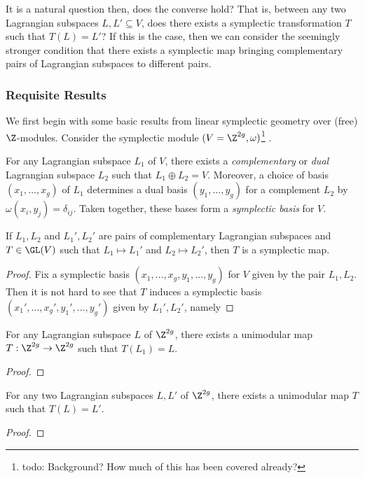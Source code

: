 It is a natural question then, does the converse hold? That is, between any two Lagrangian subspaces $L,L' \subseteq V$, does there exists a symplectic transformation $T$ such that $T(L) = L'$? If this is the case, then we can consider the seemingly stronger condition that there exists a symplectic map bringing complementary pairs of Lagrangian subspaces to different pairs.

\subsubsection*{Requisite Results}
We first begin with some basic results from linear symplectic geometry over (free) $\Z$-modules. Consider the symplectic module $(V = \Z^{2g}, \omega)$\footnote{todo: Background? How much of this has been covered already?} .
\begin{theorem}
	For any Lagrangian subspace $L_1$ of $V$, there exists a \textit{complementary} or \textit{dual} Lagrangian subspace $L_2$ such that $L_1 \oplus L_2 = V$. Moreover, a choice of basis $(x_1,\dots,x_g)$ of $L_1$ determines a dual basis $(y_1,\dots,y_g)$ for a complement $L_2$ by $\omega(x_i, y_j) = \delta_{ij}$. Taken together, these bases form a \textit{symplectic basis} for $V$. 
\end{theorem}

\begin{proposition}
	If $L_1,L_2$ and $L_1',L_2'$ are pairs of complementary Lagrangian subspaces and $T \in \GL(V)$ such that $L_1 \mapsto L_1'$ and $L_2 \mapsto L_2'$, then $T$ is a symplectic map.
\end{proposition}
\begin{proof}
	Fix a symplectic basis $(x_1,\dots,x_g,y_1,\dots,y_g)$ for $V$ given by the pair $L_1,L_2$. Then it is not hard to see that $T$ induces a symplectic basis $(x_1',\dots,x_g',y_1',\dots,y_g')$ given by $L_1',L_2'$, namely 
\end{proof}


\begin{proposition}
	For any Lagrangian subspace $L$ of $\Z^{2g}$, there exists a unimodular map $T: \Z^{2g} \to \Z^{2g}$ such that $T(L_1) = L$.
\end{proposition}
\begin{proof}
	
\end{proof}

\begin{corollary}
	For any two Lagrangian subspaces $L,L'$ of $\Z^{2g}$, there exists a unimodular map $T$ such that $T(L) = L'$.
\end{corollary}

\begin{proof}
	
\end{proof}

